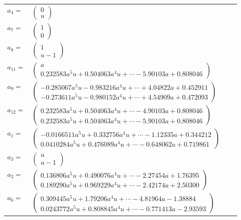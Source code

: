 \documentclass[1p]{elsarticle_modified}
\theoremstyle{definition}
\begin{document}
\begin{tabular}{m{7pt} m{180pt} m{7pt} m{180pt} }
\flushright $a_{4}=$&$\begin{pmatrix}0\\u\end{pmatrix}$ \\
\flushright $a_{7}=$&$\begin{pmatrix}1\\0\end{pmatrix}$ \\
\flushright $a_{8}=$&$\begin{pmatrix}1\\u-1\end{pmatrix}$ \\
\flushright $a_{11}=$&$\begin{pmatrix}a\\0.232583 a^{5} u+0.504063 a^{4} u+\cdots-5.90103 a+0.808046\end{pmatrix}$ \\
\flushright $a_{9}=$&$\begin{pmatrix}-0.285067 a^{5} u-0.983216 a^{4} u+\cdots+4.04822 a+0.452911\\-0.273611 a^{5} u-0.980152 a^{4} u+\cdots+4.54909 a+0.472093\end{pmatrix}$ \\
\flushright $a_{12}=$&$\begin{pmatrix}0.232583 a^{5} u+0.504063 a^{4} u+\cdots-4.90103 a+0.808046\\0.232583 a^{5} u+0.504063 a^{4} u+\cdots-5.90103 a+0.808046\end{pmatrix}$ \\
\flushright $a_{1}=$&$\begin{pmatrix}-0.0166511 a^{5} u+0.332756 a^{4} u+\cdots-1.12335 a+0.344212\\0.0410284 a^{5} u+0.476089 a^{4} u+\cdots-0.648062 a+0.719861\end{pmatrix}$ \\
\flushright $a_{3}=$&$\begin{pmatrix}u\\u-1\end{pmatrix}$ \\
\flushright $a_{2}=$&$\begin{pmatrix}0.136806 a^{5} u+0.490076 a^{4} u+\cdots-2.27454 a+1.76395\\0.189290 a^{5} u+0.969229 a^{4} u+\cdots-2.42174 a+2.50300\end{pmatrix}$ \\
\flushright $a_{6}=$&$\begin{pmatrix}0.309445 a^{5} u+1.79206 a^{4} u+\cdots-4.81964 a-1.38884\\0.0243772 a^{5} u+0.808845 a^{4} u+\cdots-0.771413 a-2.93593\end{pmatrix}$ \\

\end{tabular}
\end{document}
